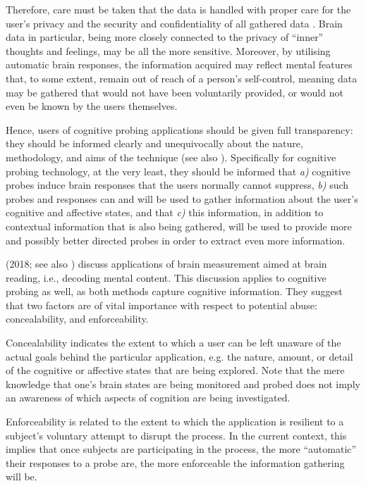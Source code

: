 Therefore, care must be taken that the data is handled with proper care for the user's privacy and the security and confidentiality of all gathered data \cite{fairclough2014confidential}. Brain data in particular, being more closely connected to the privacy of ``inner'' thoughts and feelings, may be all the more sensitive. Moreover, by utilising automatic brain responses, the information acquired may reflect mental features that, to some extent, remain out of reach of a person's self-control, meaning data may be gathered that would not have been voluntarily provided, or would not even be known by the users themselves.

Hence, users of cognitive probing applications should be given full transparency: they should be informed clearly and unequivocally about the nature, methodology, and aims of the technique (see also ). Specifically for cognitive probing technology, at the very least, they should be informed that \emph{a)} cognitive probes induce brain responses that the users normally cannot suppress, \emph{b)} such probes and responses can and will be used to gather information about the user's cognitive and affective states, and that \emph{c)} this information, in addition to contextual information that is also being gathered, will be used to provide more and possibly better directed probes in order to extract even more information.

\citeauthor{haselager2018reading} (2018; see also ) discuss applications of brain measurement aimed at brain reading, i.e., decoding mental content. This discussion applies to cognitive probing as well, as both methods capture cognitive information. They suggest that two factors are of vital importance with respect to potential abuse: concealability, and enforceability. 

Concealability indicates the extent to which a user can be left unaware of the actual goals behind the particular application, e.g. the nature, amount, or detail of the cognitive or affective states that are being explored. Note that the mere knowledge that one's brain states are being monitored and probed does not imply an awareness of which aspects of cognition are being investigated.

Enforceability is related to the extent to which the application is resilient to a subject's voluntary attempt to disrupt the process. In the current context, this implies that once subjects are participating in the process, the more ``automatic'' their responses to a probe are, the more enforceable the information gathering will be. 

